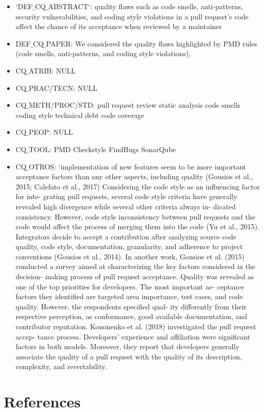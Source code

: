 \documentclass[conference]{IEEEtran}
\begin{document}
\begin{itemize}
\item `DEF$\_$CQ$\_$ABSTRACT`: quality flaws such as code smells, anti-patterns, security
vulnerabilities, and coding style violations in a pull request’s code affect the chance of its acceptance
when reviewed by a maintainer
\item DEF$\_$CQ$\_$PAPER: 
We considered the quality flaws highlighted by PMD rules (code smells, anti-patterns, and coding style violations),
\item CQ$\_$ATRIB: NULL
\item CQ$\_$PRAC/TECN: NULL
\item CQ$\_$METH/PROC/STD: 
pull request
review
static analysis
code smells
coding style
technical debt
code coverage 
\item CQ$\_$PEOP: NULL
\item  CQ$\_$TOOL: PMD
Checkstyle
FindBugs
SonarQube
\item CQ$\_$OTROS:  `implementation of new features seem to be more important acceptance factors than any other aspects, including quality (Gousios et al., 2015; Calefato et al., 2017) Considering the code style as an influencing factor for inte- grating pull requests, several code style criteria have generally revealed high divergence while several other criteria always in- dicated consistency. However, code style inconsistency between pull requests and the code would affect the process of merging them into the code (Yu et al., 2015).  Integrators decide to accept a contribution after analyzing source code quality, code style, documentation, granularity, and adherence to project conventions (Gousios et al., 2014). 
In another work, Gousios et al. (2015) conducted a survey aimed at characterizing the key factors considered in the decision- making process of pull request acceptance. Quality was revealed as one of the top priorities for developers. The most important ac- ceptance factors they identified are targeted area importance, test cases, and code quality. However, the respondents specified qual- ity differently from their respective perception, as conformance, good available documentation, and contributor reputation.
Kononenko et al. (2018) investigated the pull request accep- tance process. Developers’ experience and affiliation were significant factors in both models. Moreover, they report that developers generally associate the quality of a pull request with the quality of its description, complexity, and revertability. 

\end{itemize}

\section*{References}




\end{document}
